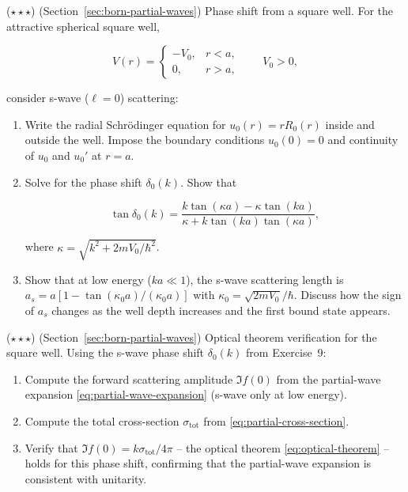 \begin{problemset}
\item ($\star\star\star$) (Section~\ref{sec:born-partial-waves}) Phase shift from a square well. For the attractive spherical square well,
\begin{linenomath}
\begin{equation*}
V(r) = \begin{cases}
-V_{0}, & r < a, \\
0, & r > a,
\end{cases}
\qquad V_{0} > 0,
\end{equation*}
\end{linenomath}
consider s-wave ($\ell=0$) scattering:
\begin{enumerate}
\item[(a)] Write the radial Schr\"odinger equation for $u_{0}(r)=rR_{0}(r)$ inside and outside the well. Impose the boundary conditions $u_{0}(0)=0$ and continuity of $u_{0}$ and $u_{0}'$ at $r=a$.
\item[(b)] Solve for the phase shift $\delta_{0}(k)$. Show that
\begin{linenomath}
\begin{equation*}
\tan\delta_{0}(k) = \frac{k\tan(\kappa a) - \kappa\tan(ka)}{\kappa + k\tan(ka)\tan(\kappa a)},
\end{equation*}
\end{linenomath}
where $\kappa = \sqrt{k^{2} + 2mV_{0}/\hbar^{2}}$.
\item[(c)] Show that at low energy ($ka \ll 1$), the s-wave scattering length is $a_{s} = a[1 - \tan(\kappa_{0}a)/(\kappa_{0}a)]$ with $\kappa_{0} = \sqrt{2mV_{0}}/\hbar$. Discuss how the sign of $a_{s}$ changes as the well depth increases and the first bound state appears.
\end{enumerate}

\item ($\star\star\star$) (Section~\ref{sec:born-partial-waves}) Optical theorem verification for the square well. Using the s-wave phase shift $\delta_{0}(k)$ from Exercise~9:
\begin{enumerate}
\item[(a)] Compute the forward scattering amplitude $\Im f(0)$ from the partial-wave expansion \eqref{eq:partial-wave-expansion} (s-wave only at low energy).
\item[(b)] Compute the total cross-section $\sigma_{\text{tot}}$ from \eqref{eq:partial-cross-section}.
\item[(c)] Verify that $\Im f(0) = k\sigma_{\text{tot}}/4\pi$ -- the optical theorem \eqref{eq:optical-theorem} -- holds for this phase shift, confirming that the partial-wave expansion is consistent with unitarity.
\end{enumerate}

\end{problemset}
